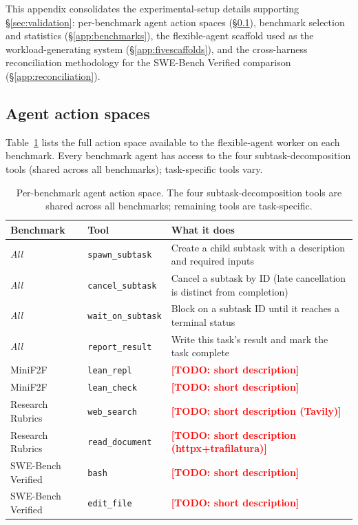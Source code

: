 \documentclass{article}
\newcommand{\todo}[1]{\textcolor{red}{\textbf{[TODO: #1]}}}
\begin{document}
This appendix consolidates the experimental-setup details supporting
\S\ref{sec:validation}: per-benchmark agent action spaces
(\S\ref{app:actions}), benchmark selection and statistics
(\S\ref{app:benchmarks}), the flexible-agent scaffold used as the
workload-generating system (\S\ref{app:fivescaffolds}), and the
cross-harness reconciliation methodology for the SWE-Bench Verified
comparison (\S\ref{app:reconciliation}).

\subsection{Agent action spaces}
\label{app:actions}

Table~\ref{tab:actions} lists the full action space available to
the flexible-agent worker on each benchmark. Every benchmark
agent has access to the four subtask-decomposition tools (shared
across all benchmarks); task-specific tools vary.

\begin{table}[h]
\centering
\small
\caption{Per-benchmark agent action space. The four
subtask-decomposition tools are shared across all benchmarks;
remaining tools are task-specific.}
\label{tab:actions}
\begin{tabular}{@{}lll@{}}
\toprule
\textbf{Benchmark} & \textbf{Tool} & \textbf{What it does} \\
\midrule
\textit{All} & \texttt{spawn\_subtask} & Create a child subtask with a description and required inputs \\
\textit{All} & \texttt{cancel\_subtask} & Cancel a subtask by ID (late cancellation is distinct from completion) \\
\textit{All} & \texttt{wait\_on\_subtask} & Block on a subtask ID until it reaches a terminal status \\
\textit{All} & \texttt{report\_result} & Write this task's result and mark the task complete \\
\midrule
MiniF2F & \texttt{lean\_repl} & \todo{short description} \\
MiniF2F & \texttt{lean\_check} & \todo{short description} \\
\midrule
Research Rubrics & \texttt{web\_search} & \todo{short description (Tavily)} \\
Research Rubrics & \texttt{read\_document} & \todo{short description (httpx+trafilatura)} \\
\midrule
SWE-Bench Verified & \texttt{bash} & \todo{short description} \\
SWE-Bench Verified & \texttt{edit\_file} & \todo{short description} \\
\bottomrule
\end{tabular}
\end{table}
\end{document}
